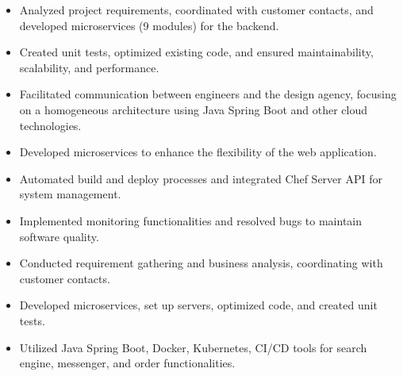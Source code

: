 \begin{itemize}
\item Analyzed project requirements, coordinated with customer contacts, and developed microservices (9 modules) for the backend.
\item Created unit tests, optimized existing code, and ensured maintainability, scalability, and performance.
\item Facilitated communication between engineers and the design agency, focusing on a homogeneous architecture using Java Spring Boot and other cloud technologies.
\end{itemize}

\divider

\begin{itemize}
\item Developed microservices to enhance the flexibility of the web application.
\item Automated build and deploy processes and integrated Chef Server API for system management.
\item Implemented monitoring functionalities and resolved bugs to maintain software quality.
\end{itemize}

\divider

\begin{itemize}
\item Conducted requirement gathering and business analysis, coordinating with customer contacts.
\item Developed microservices, set up servers, optimized code, and created unit tests.
\item Utilized Java Spring Boot, Docker, Kubernetes, CI/CD tools for search engine, messenger, and order functionalities.
\end{itemize}


\divider

\divider

\divider

\divider


